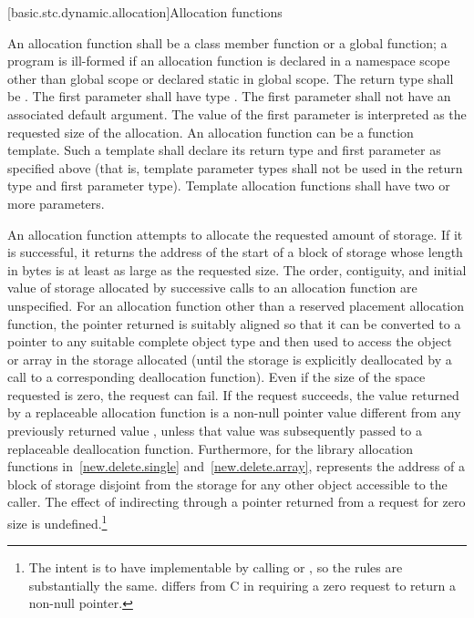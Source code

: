 [basic.stc.dynamic.allocation]{Allocation functions}

\pnum
{}%
An allocation function shall be a class member function or a global
function; a program is ill-formed if an allocation function is declared
in a namespace scope other than global scope or declared static in
global scope. The return type shall be . The first
parameter shall have type . The
first parameter shall not have an associated default
argument. The value of the first parameter
is interpreted as the requested size of the allocation. An allocation
function can be a function template. Such a template shall declare its
return type and first parameter as specified above (that is, template
parameter types shall not be used in the return type and first parameter
type). Template allocation functions shall have two or more parameters.

\pnum
An allocation function attempts to allocate the requested amount of
storage. If it is successful, it returns the address of the start
of a block of storage whose length in bytes is at least as large
as the requested size.
The order,
contiguity, and initial value of storage allocated by successive calls
to an allocation function are unspecified.
For an allocation function other than
a reserved placement allocation function,
the pointer returned is
suitably aligned so that it can be converted to a pointer to any
suitable complete object type
and then used to access the object or array in the
storage allocated (until the storage is explicitly deallocated by a call
to a corresponding deallocation function). Even if the size of the space
requested is zero, the request can fail. If the request succeeds, the
value returned by a replaceable allocation function
is a non-null pointer value
 different from any previously returned value ,
unless that value  was subsequently passed to a
replaceable deallocation function.
Furthermore, for the library allocation functions
in~\ref{new.delete.single} and~\ref{new.delete.array},
 represents the address of a block of storage disjoint from the storage
for any other object accessible to the caller.
The effect of indirecting through a pointer
returned from a request for zero size is undefined.\footnote{The intent is
to have  implementable by
calling  or , so the rules are
substantially the same. \Cpp{} differs from C in requiring a zero request
to return a non-null pointer.}

